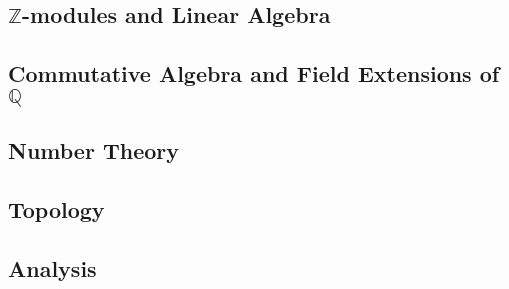 \documentclass{article}
\newcommand{\Z}[0]{\mathbb{Z}}		%
\newcommand{\Q}[0]{\mathbb{Q}}		%
\theoremstyle{definition}
\theoremstyle{remark}
\begin{document}
\subsection{$\Z$-modules and Linear Algebra}
\subsection{Commutative Algebra and Field Extensions of $\Q$}
\subsection{Number Theory}
\subsection{Topology}
\subsection{Analysis}
\end{document}
